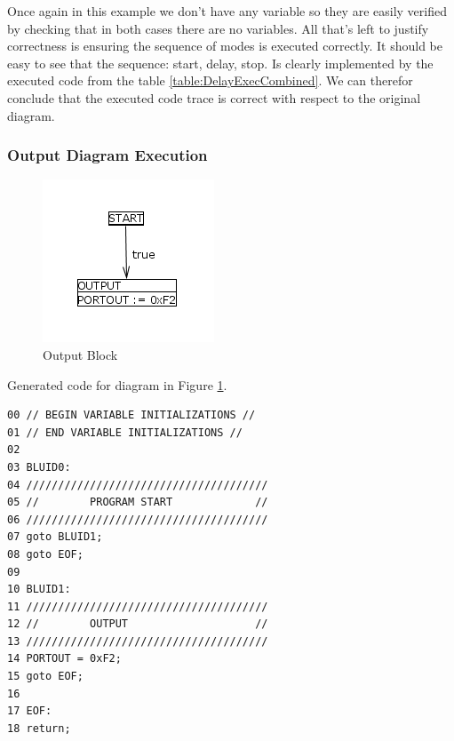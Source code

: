 Once again in this example we don't have any variable so they are easily verified by checking that in both cases
there are no variables. All that's left to justify correctness is ensuring the sequence of modes is executed correctly.
It should be easy to see that the sequence: start, delay, stop. Is clearly implemented by the executed code from the table
\ref{table:DelayExecCombined}. We can therefor conclude that the executed code trace is correct with respect to the original
diagram.

\subsubsection{Output Diagram Execution}

\begin{figure}[htb]
	\centering
	\includegraphics[width=\imgmedsmall]{./images/correctness_ex_output.png}
	\caption{Output Block}
	\label{fig:correctness_ex_output}
\end{figure}

Generated  code for diagram in Figure \ref{fig:correctness_ex_output}.
\begin{lstlisting}[frame=single]
00 // BEGIN VARIABLE INITIALIZATIONS //
01 // END VARIABLE INITIALIZATIONS //
02 
03 BLUID0:
04 //////////////////////////////////////
05 //        PROGRAM START             //
06 //////////////////////////////////////
07 goto BLUID1;
08 goto EOF;
09 
10 BLUID1:
11 //////////////////////////////////////
12 //        OUTPUT                    //
13 //////////////////////////////////////
14 PORTOUT = 0xF2;
15 goto EOF;
16 
17 EOF:
18 return;
\end{lstlisting}

